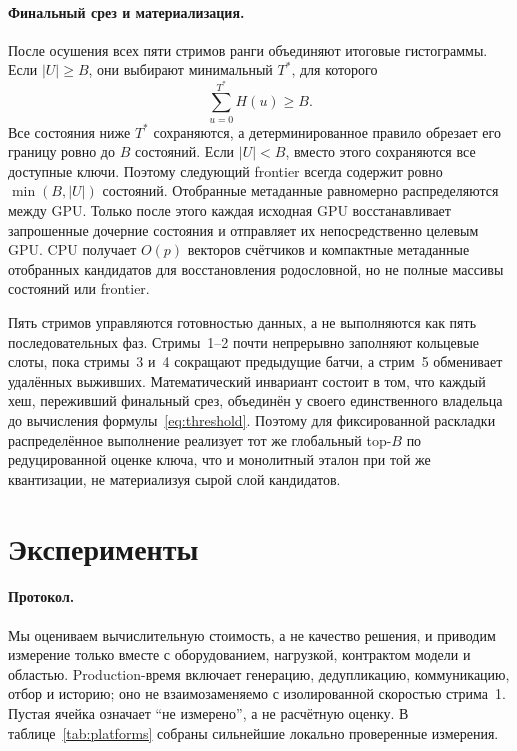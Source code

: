 \documentclass[10pt,twocolumn]{article}
\newcommand{\beam}{B}
\begin{document}
\paragraph{Финальный срез и материализация.}
После осушения всех пяти стримов ранги объединяют итоговые гистограммы. Если
$|U|\geq\beam$, они выбирают минимальный $T^*$, для которого
\begin{equation}
 \sum_{u=0}^{T^*}H(u)\geq\beam.
 \label{eq:threshold}
\end{equation}
Все состояния ниже $T^*$ сохраняются, а детерминированное правило обрезает его
границу ровно до $\beam$ состояний. Если $|U|<\beam$, вместо этого сохраняются
все доступные ключи. Поэтому следующий frontier всегда содержит ровно
$\min(\beam,|U|)$ состояний. Отобранные метаданные равномерно распределяются
между GPU. Только после этого каждая исходная GPU восстанавливает
запрошенные дочерние состояния и отправляет их непосредственно целевым GPU. CPU
получает $O(p)$ векторов счётчиков и компактные метаданные отобранных кандидатов
для восстановления родословной, но не полные массивы состояний или frontier.

Пять стримов управляются готовностью данных, а не выполняются как пять
последовательных фаз. Стримы~1--2 почти непрерывно заполняют кольцевые слоты,
пока стримы~3 и~4 сокращают предыдущие батчи, а стрим~5 обменивает удалённых
выживших. Математический инвариант состоит в том, что каждый хеш, переживший
финальный срез, объединён у своего единственного владельца до вычисления
формулы~\eqref{eq:threshold}. Поэтому для фиксированной раскладки распределённое
выполнение реализует тот же глобальный top-$\beam$ по редуцированной оценке
ключа, что и монолитный эталон при той же квантизации, не материализуя сырой
слой кандидатов.

\section{Эксперименты}
\paragraph{Протокол.}
Мы оцениваем вычислительную стоимость, а не качество решения, и приводим
измерение только вместе с оборудованием, нагрузкой, контрактом модели и
областью. Production-время включает генерацию, дедупликацию, коммуникацию,
отбор и историю; оно не взаимозаменяемо с изолированной скоростью стрима~1.
Пустая ячейка означает ``не измерено'', а не расчётную оценку. В
таблице~\ref{tab:platforms} собраны сильнейшие локально проверенные измерения.
\end{document}
